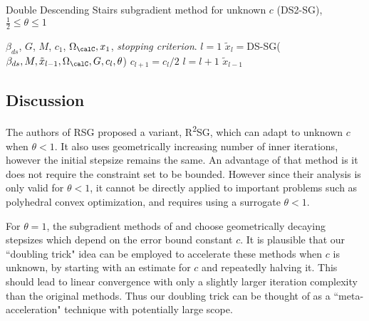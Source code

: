 \documentclass[smallextended]{svjour3}
\begin{document}
 \begin{algorithm}
   \caption{Double Descending Stairs subgradient method for unknown $c$ (DS2-SG), $\frac{1}{2}\leq\theta\leq 1$}
   \begin{algorithmic}[1]
   \REQUIRE $\beta_{ds}$, $G$, $M$, $c_1$, $\Omega_{\calC}, x_1$, \emph{stopping criterion}.
   \STATE $l= 1$
      \STATE $\tilde{x}_l= $DS-SG($\beta_{ds},M,\tilde{x}_{l-1},\Omega_{\calC},G,c_l,\theta$)
      \STATE $c_{l+1}=c_l/2$
      \STATE $l= l+1$
   \ENDWHILE 
   \RETURN $\tilde{x}_{l-1}$
   \end{algorithmic}
   \label{AdReSG}
   \end{algorithm}
   

\subsection{Discussion}

    The authors of RSG \cite{yang2015rsg} proposed a variant, R\textsuperscript{2}SG, which can adapt to unknown $c$ when $\theta<1$. It also uses geometrically increasing number of inner iterations, however the initial stepsize remains the same. An advantage of that method is it does not require the constraint set to be bounded. However since their analysis is only valid for $\theta<1$, it cannot be directly applied to important problems such as polyhedral convex optimization, and requires using a surrogate $\theta<1$.
    
    For $\theta=1$, the subgradient methods of \cite[Sec. 2.3]{shor2012minimization} and \cite{goffin1977convergence} choose geometrically decaying stepsizes which depend on the error bound constant $c$. It is plausible that our ``doubling trick" idea can be employed to accelerate these methods when $c$ is unknown, by starting with an estimate for $c$ and repeatedly halving it. This should lead to linear convergence with only a slightly larger iteration complexity than the original methods. Thus our doubling trick can be thought of as a ``meta-acceleration" technique with potentially large scope. 
   
\end{document}
